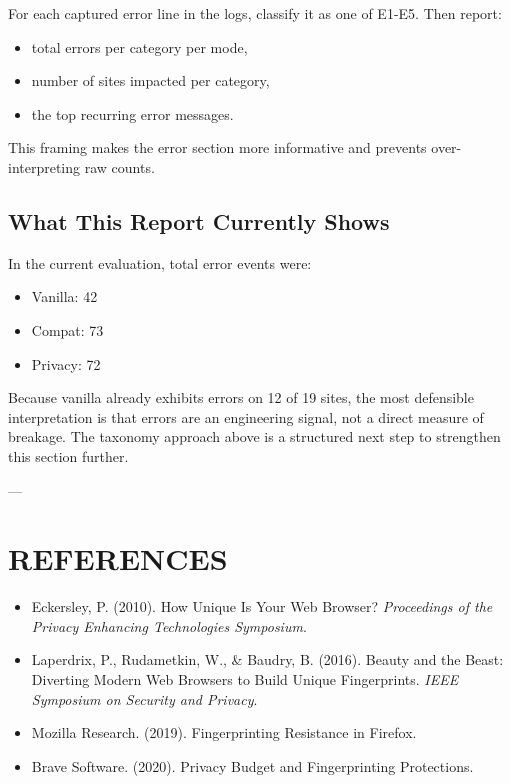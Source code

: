 \documentclass[11pt]{report}
\begin{document}
For each captured error line in the logs, classify it as one of E1-E5. Then report:

\begin{itemize}
    \item total errors per category per mode,
    \item number of sites impacted per category,
    \item the top recurring error messages.
\end{itemize}

This framing makes the error section more informative and prevents over-interpreting raw counts.

\section{What This Report Currently Shows}

In the current evaluation, total error events were:

\begin{itemize}
    \item Vanilla: 42
    \item Compat: 73
    \item Privacy: 72
\end{itemize}

Because vanilla already exhibits errors on 12 of 19 sites, the most defensible interpretation is that errors are an engineering signal, not a direct measure of breakage. The taxonomy approach above is a structured next step to strengthen this section further.

\clearpage

---

\chapter{REFERENCES}

\begin{itemize}
    \item Eckersley, P. (2010). How Unique Is Your Web Browser? \textit{Proceedings of the Privacy Enhancing Technologies Symposium}.
    \item Laperdrix, P., Rudametkin, W., \& Baudry, B. (2016). Beauty and the Beast: Diverting Modern Web Browsers to Build Unique Fingerprints. \textit{IEEE Symposium on Security and Privacy}.
    \item Mozilla Research. (2019). Fingerprinting Resistance in Firefox.
    \item Brave Software. (2020). Privacy Budget and Fingerprinting Protections.
\end{itemize}
\end{document}
